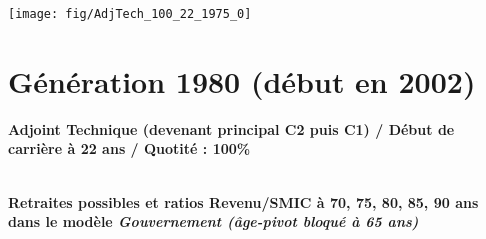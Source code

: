  \vspace{0.1cm} 

 {\hspace{-2.2cm}\texttt{[image: fig/AdjTech\_100\_22\_1975\_0]}} 

\newpage 
 
\section{Génération 1980 (début en 2002)\label{AdjTech_100_22_1980_0}} 
 
{\bf \noindent Adjoint Technique (devenant principal C2 puis C1) / Début de carrière à 22 ans / Quotité : 100\%}  ~ 

 ~\\{\bf \noindent Retraites possibles et ratios Revenu/SMIC à 70, 75, 80, 85, 90 ans dans le modèle \emph{Gouvernement (âge-pivot bloqué à 65 ans)}}  
 
